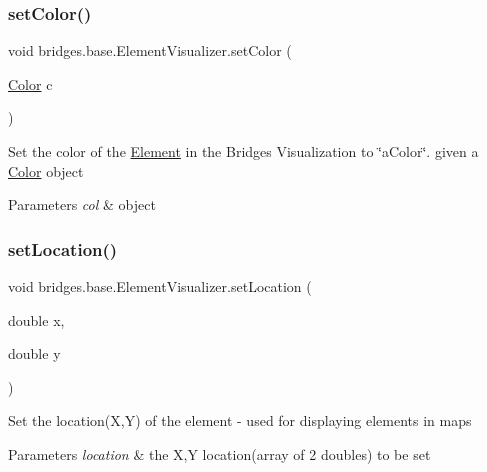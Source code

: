 \subsubsection{\texorpdfstring{set\+Color()}{setColor()}\hspace{0.1cm}{\footnotesize\ttfamily [3/3]}}
{\footnotesize\ttfamily void bridges.\+base.\+Element\+Visualizer.\+set\+Color (\begin{DoxyParamCaption}\item[{\hyperlink{classbridges_1_1base_1_1_color}{Color}}]{c }\end{DoxyParamCaption})}

Set the color of the \hyperlink{classbridges_1_1base_1_1_element}{Element} in the Bridges Visualization to \char`\"{}a\+Color\char`\"{}. given a \hyperlink{classbridges_1_1base_1_1_color}{Color} object


\begin{DoxyParams}{Parameters}
{\em col} & object \\
\hline
\end{DoxyParams}
\hypertarget{classbridges_1_1base_1_1_element_visualizer_a04f3416447f2042de7cd21ce5b6a0598}{}\label{classbridges_1_1base_1_1_element_visualizer_a04f3416447f2042de7cd21ce5b6a0598} 
\subsubsection{\texorpdfstring{set\+Location()}{setLocation()}}
{\footnotesize\ttfamily void bridges.\+base.\+Element\+Visualizer.\+set\+Location (\begin{DoxyParamCaption}\item[{double}]{x,  }\item[{double}]{y }\end{DoxyParamCaption})}

Set the location(\+X,\+Y) of the element -\/ used for displaying elements in maps


\begin{DoxyParams}{Parameters}
{\em location} & the X,Y location(array of 2 doubles) to be set \\
\hline
\end{DoxyParams}
\hypertarget{classbridges_1_1base_1_1_element_visualizer_a932f62eb1bd0c92da265a7f903dd0790}{}\label{classbridges_1_1base_1_1_element_visualizer_a932f62eb1bd0c92da265a7f903dd0790} 
